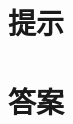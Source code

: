 \documentclass{ctexart}
\begin{document}
    \section{提示}
    \printhint
    \section{答案}
    \printanswer
\end{document}

